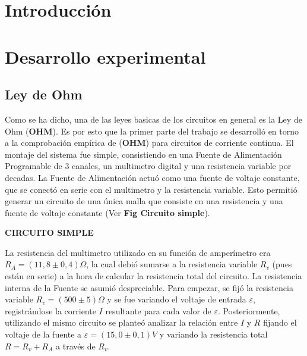 \documentclass[11pt,a4paper]{article}
\begin{document}
\section{Introducción}\label{sec:intro}
	


\section{Desarrollo experimental}

\subsection{Ley de Ohm}

Como se ha dicho, una de las leyes basicas de los circuitos en general es la Ley de Ohm (\textbf{OHM}). Es por esto que la primer parte del trabajo se desarrolló en torno a la comprobación empírica de (\textbf{OHM}) para circuitos de corriente continua. El montaje del sistema fue simple, consistiendo en una Fuente de Alimentación Programable de 3 canales, un multimetro digital y una resistencia variable por decadas. La Fuente de Alimentación actuó como una fuente de voltaje constante, que se conectó en serie con el multimetro y la resistencia variable. Esto permitió generar un circuito de una única malla que consiste en una resistencia y una fuente de voltaje constante (Ver \textbf{Fig Circuito simple}). 

\textbf{CIRCUITO SIMPLE}

La resistencia del multimetro utilizado en su función de amperímetro era $R_{A} = (11,8 \pm 0,4) \Omega$, la cual debió sumarse a la resistencia variable $R_v$ (pues están en serie) a la hora de calcular la resistencia total del circuito. La resistencia interna de la Fuente se asumió despreciable. Para empezar, se fijó la resistencia variable $R_v = (500 \pm 5)\Omega$ y se fue variando el voltaje de entrada $\varepsilon$, registrándose la corriente $I$ resultante para cada valor de $\varepsilon$. Posteriormente, utilizando el mismo circuito se planteó analizar la relación entre $I$ y $R$ fijando el voltaje de la fuente a $\varepsilon = (15,0 \pm 0,1)V$ y variando la resistencia total $R = R_v + R_A$ a través de $R_v$. 
\end{document}
